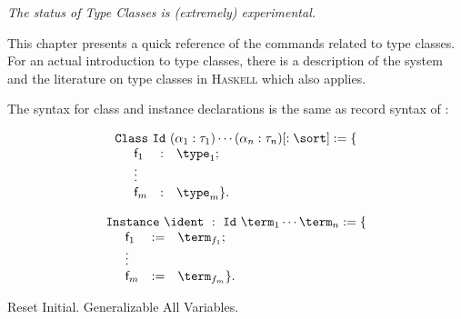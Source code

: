 \def\Haskell{\textsc{Haskell}\xspace}
\def\eol{\setlength\parskip{0pt}\par}
\def\indent#1{\noindent\kern#1}
\def\cst#1{\textsf{#1}}

\newcommand\tele[1]{\overrightarrow{#1}}

\label{typeclasses}

\begin{flushleft}
  \em The status of Type Classes is (extremely) experimental.
\end{flushleft}

This chapter presents a quick reference of the commands related to type
classes. For an actual introduction to type classes, there is a
description of the system \cite{sozeau08} and the literature on type
classes in \Haskell which also applies.

\label{ClassesInstances}

The syntax for class and instance declarations is the same as
record syntax of \Coq:
\def\kw{\texttt}
\def\classid{\texttt}

\begin{center}
\[\begin{array}{l}
\kw{Class}~\classid{Id}~(\alpha_1 : \tau_1) \cdots (\alpha_n : \tau_n) 
[: \sort] := \{\\
\begin{array}{p{0em}lcl}
  & \cst{f}_1 & : & \type_1 ; \\
  & \vdots & &  \\
  & \cst{f}_m & : & \type_m \}.
\end{array}\end{array}\]
\end{center}
\begin{center}
\[\begin{array}{l}
\kw{Instance}~\ident~:~\classid{Id}~\term_1 \cdots \term_n := \{\\
\begin{array}{p{0em}lcl}
  & \cst{f}_1 & := & \term_{f_1} ; \\
  & \vdots & &  \\
  & \cst{f}_m & := & \term_{f_m} \}.
\end{array}\end{array}\]
\end{center}
\begin{coq_eval}
  Reset Initial.
  Generalizable All Variables.
\end{coq_eval}

